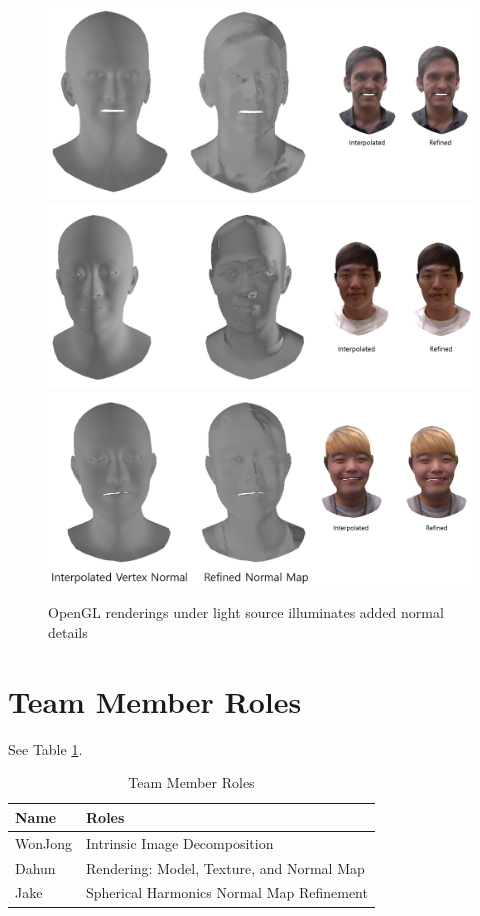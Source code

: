 \documentclass[10pt,twocolumn,letterpaper]{article}
\begin{document}
\begin{figure}[t]
    \begin{center}
        \includegraphics [scale=0.45] {image/render1.png}
        \includegraphics [scale=0.45] {image/render2.png}
        \includegraphics [scale=0.45] {image/render3.png}
    \end{center}
    \caption{OpenGL renderings under light source illuminates added normal details}
    \label{fig:render}
\end{figure} 

\section{Team Member Roles}
See Table \ref{tab:roles}.
\begin{table}[!h]
	\begin{tabular}{l|l}
		\textbf{Name} & Roles \\
		\hline
		WonJong & Intrinsic Image Decomposition \\
		Dahun & Rendering: Model, Texture, and Normal Map \\
		Jake & Spherical Harmonics Normal Map Refinement \\
		\hline
	\end{tabular}
	\caption{Team Member Roles}
	\label{tab:roles}
\end{table}
\end{document}
